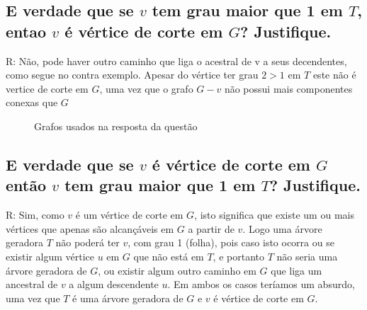 \documentclass[final,3p,12pt]{elsarticle}
\begin{document}
	\subsection{E verdade que se $v$ tem grau maior que 1 em $T$, entao $v$ é vértice de corte em $G$? Justifique.}
		R: Não, pode haver outro caminho que liga o acestral de v a seus decendentes, como segue no contra exemplo.
		Apesar do vértice ter grau $2 > 1$ em $T$ este não é vertice de corte em $G$, uma vez que o grafo $G - v$ não possui mais componentes conexas que $G$
		\begin{figure}[!ht]
			\centering
			\caption{Grafos usados na resposta da questão \thesection}
		\end{figure}

	\subsection{E verdade que se $v$ é vértice de corte em $G$ então $v$ tem grau maior que 1 em $T$? Justifique.} 
		
		R: Sim, como $v$ é um vértice de corte em $G$, isto significa que existe um ou mais vértices que apenas são alcançáveis em $G$ a partir de $v$. Logo uma árvore geradora $T$ não poderá ter $v$, com grau 1 (folha), pois caso isto ocorra ou se existir algum vértice $u$ em $G$ que não está em $T$, e portanto $T$ não seria uma árvore geradora de $G$, ou existir algum outro caminho em $G$ que liga um ancestral de $v$ a algum descendente $u$. Em ambos os casos teríamos um absurdo, uma vez que $T$ é uma árvore geradora de $G$ e $v$ é vértice de corte em $G$.
\end{document}
